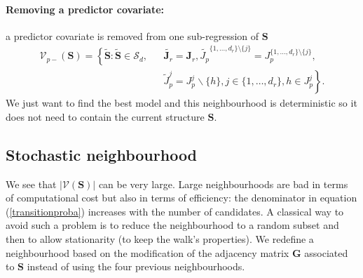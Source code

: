 \documentclass[12pt,a4paper]{report}
\begin{document}
	\paragraph{Removing a predictor covariate:} a predictor covariate is removed from one sub-regression of $\boldsymbol{S}$
\begin{eqnarray}
\mathcal{V}_{p-}(\boldsymbol{S}) = \left\{\tilde{\boldsymbol{S}}: \tilde{\boldsymbol{S}}\in\mathcal{S}_d,\right. && \tilde{\boldsymbol{J}_r}=\boldsymbol{J}_r,\tilde{J_p}^{\{1,\dots,d_r \}\setminus \{j\}}=J_p^{\{1,\dots,d_r \}\setminus \{j\}} , \nonumber \\
& & \left.  \tilde{J}_p^{j}=J_p^{j} \backslash \{h\}, j\in \{1,\ldots,d_r\}, h\in  J_p^j \right\}. \nonumber
\end{eqnarray}	
	We just want to find the best model and this neighbourhood is deterministic so it does not need to contain the current structure $\boldsymbol{S}$.
		
	
	\subsection{Stochastic neighbourhood}
	We see that $|\mathcal{V}(\boldsymbol{S})|$ can be very large. Large neighbourhoods are bad in terms of computational cost but also in terms of efficiency: the denominator in equation (\ref{transitionproba}) increases with the number of candidates. A classical way to avoid such a problem is to reduce the neighbourhood to a random subset and then to allow stationarity (to keep the walk's properties). %
	  We 
	  redefine a neighbourhood based on the modification of the adjacency matrix $\boldsymbol{G}$ associated to $\boldsymbol{S}$ instead of using the four previous neighbourhoods.\\
	  	
\end{document}
